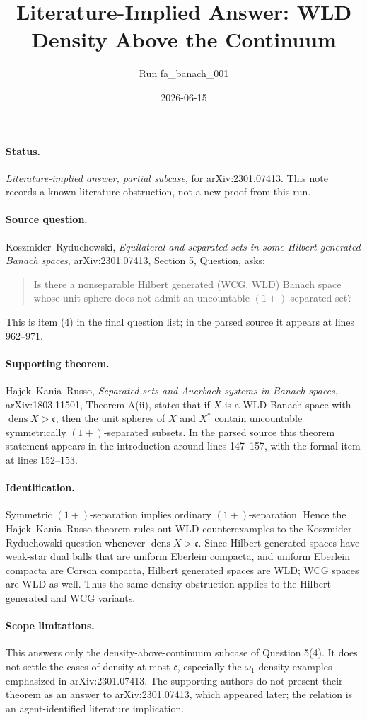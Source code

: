\documentclass[11pt]{article}
\title{Literature-Implied Answer: WLD Density Above the Continuum}
\author{Run fa\_banach\_001}
\date{2026-06-15}
\begin{document}
\maketitle

\paragraph{Status.}
\emph{Literature-implied answer, partial subcase}, for arXiv:2301.07413.
This note records a known-literature obstruction, not a new proof from this run.

\paragraph{Source question.}
Koszmider--Ryduchowski, \emph{Equilateral and separated sets in some Hilbert
generated Banach spaces}, arXiv:2301.07413, Section 5, Question, asks:
\begin{quote}
Is there a nonseparable Hilbert generated (WCG, WLD) Banach space whose unit
sphere does not admit an uncountable $(1+)$-separated set?
\end{quote}
This is item (4) in the final question list; in the parsed source it appears
at lines 962--971.

\paragraph{Supporting theorem.}
Hajek--Kania--Russo, \emph{Separated sets and Auerbach systems in Banach
spaces}, arXiv:1803.11501, Theorem A(ii), states that if $X$ is a WLD Banach
space with $\operatorname{dens} X>\mathfrak c$, then the unit spheres of $X$
and $X^*$ contain uncountable symmetrically $(1+)$-separated subsets.
In the parsed source this theorem statement appears in the introduction around
lines 147--157, with the formal item at lines 152--153.

\paragraph{Identification.}
Symmetric $(1+)$-separation implies ordinary $(1+)$-separation. Hence the
Hajek--Kania--Russo theorem rules out WLD counterexamples to the
Koszmider--Ryduchowski question whenever $\operatorname{dens} X>\mathfrak c$.
Since Hilbert generated spaces have weak-star dual balls that are uniform
Eberlein compacta, and uniform Eberlein compacta are Corson compacta, Hilbert
generated spaces are WLD; WCG spaces are WLD as well. Thus the same density
obstruction applies to the Hilbert generated and WCG variants.

\paragraph{Scope limitations.}
This answers only the density-above-continuum subcase of Question 5(4). It
does not settle the cases of density at most $\mathfrak c$, especially the
$\omega_1$-density examples emphasized in arXiv:2301.07413. The supporting
authors do not present their theorem as an answer to arXiv:2301.07413, which
appeared later; the relation is an agent-identified literature implication.
\end{document}

